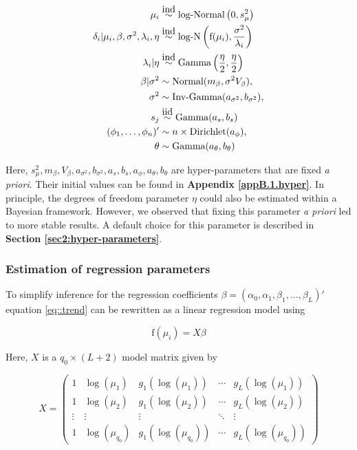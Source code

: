 \begin{align*}
\mu_i &\stackrel{\mbox{ind}}{\sim} \mbox{log-Normal}\left(0, s^2_{\mu}\right) \\
\delta_i| \mu_i,\beta,\sigma^2, \lambda_i, \eta &\stackrel{\mbox{ind}}{\sim} \text{log-N}\left( \text{f}(\mu_i),\frac{\sigma^2}{\lambda_i} \right)\\
\lambda_i|\eta &\stackrel{\mbox{ind}}{\sim} \text{Gamma}\left(\frac{\eta}{2},\frac{\eta}{2}\right)\\
\beta|\sigma^2 & \sim \textnormal{Normal}(m_\beta,\sigma^2V_\beta),\\
\sigma^2 & \sim  \textnormal{Inv-Gamma}(a_{\sigma^2},b_{\sigma^2}),\\
s_j & \stackrel{\mbox{iid}}{\sim}  \textnormal{Gamma}(a_s,b_s) \\
(\phi_1, \ldots, \phi_n)' & \sim  n \times \textnormal{Dirichlet}(a_\phi),\\
\theta & \sim  \textnormal{Gamma}(a_\theta,b_\theta)
\end{align*}

Here, $s^2_{\mu}, m_\beta, V_\beta, a_{\sigma^2}, b_{\sigma^2}, a_s, b_s, a_\phi, a_\theta, b_\theta$ are hyper-parameters that are fixed \emph{a priori}. Their initial values can be found in \textbf{Appendix \ref{appB.1.hyper}}. In principle, the degrees of freedom parameter $\eta$ could also be estimated within a Bayesian framework. However, we observed that fixing this parameter \emph{a priori} led to more stable results. A default choice for this parameter is described in \textbf{Section \ref{sec2:hyper-parameters}}.

\newpage

\subsubsection{Estimation of regression parameters}

To simplify inference for the regression coefficients $\beta = (\alpha_0, \alpha_1, \beta_1, \ldots, \beta_L)'$ equation \ref{eq::trend} can be rewritten as a linear regression model using 

\begin{equation} \label{eq::trend2} 
\text{f}(\mu_i) = X \beta
\end{equation} 

Here, $X$ is a $q_0 \times (L+2)$ model matrix given by 

\begin{equation} \label{eq::X} X = \left( \begin{array}{ccccc}
1 & \log(\mu_1) & g_1(\log(\mu_1)) & \cdots & g_L(\log(\mu_1)) \\
1 & \log(\mu_2) & g_1(\log(\mu_2)) & \cdots & g_L(\log(\mu_2)) \\
\vdots & \vdots & \vdots & \ddots & \vdots  \\
1 & \log(\mu_{q_0}) & g_1(\log(\mu_{q_0})) & \cdots & g_L(\log(\mu_{q_0}))
\end{array}\right)
\end{equation}

